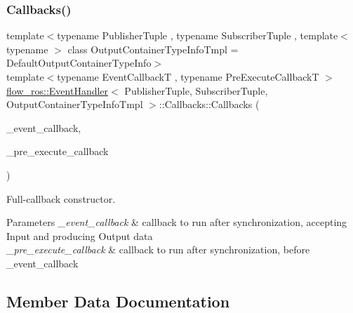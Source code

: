 \subsubsection{\texorpdfstring{Callbacks()}{Callbacks()}\hspace{0.1cm}{\footnotesize\ttfamily [2/2]}}
{\footnotesize\ttfamily template$<$typename Publisher\+Tuple , typename Subscriber\+Tuple , template$<$ typename $>$ class Output\+Container\+Type\+Info\+Tmpl = Default\+Output\+Container\+Type\+Info$>$ \\
template$<$typename Event\+CallbackT , typename Pre\+Execute\+CallbackT $>$ \\
\hyperlink{classflow__ros_1_1_event_handler}{flow\+\_\+ros\+::\+Event\+Handler}$<$ Publisher\+Tuple, Subscriber\+Tuple, Output\+Container\+Type\+Info\+Tmpl $>$\+::Callbacks\+::\+Callbacks (\begin{DoxyParamCaption}\item[{Event\+CallbackT \&\&}]{\+\_\+event\+\_\+callback,  }\item[{Pre\+Execute\+CallbackT \&\&}]{\+\_\+pre\+\_\+execute\+\_\+callback }\end{DoxyParamCaption})\hspace{0.3cm}{\ttfamily [inline]}}



Full-\/callback constructor. 


\begin{DoxyParams}{Parameters}
{\em \+\_\+event\+\_\+callback} & callback to run after synchronization, accepting Input and producing Output data \\
\hline
{\em \+\_\+pre\+\_\+execute\+\_\+callback} & callback to run after synchronization, before {\ttfamily \+\_\+event\+\_\+callback} \\
\hline
\end{DoxyParams}


\subsection{Member Data Documentation}
\mbox{\label{structflow__ros_1_1_event_handler_1_1_callbacks_ac2f9171575dff2a7adc0d5e4efa38849}} 

